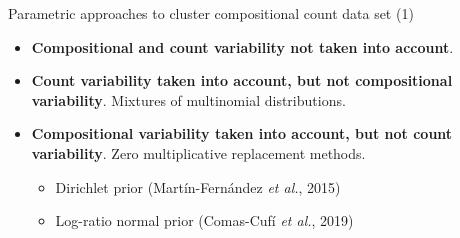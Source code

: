 \documentclass[9pt]{beamer}
\begin{document}
\begin{frame}{Parametric approaches to cluster compositional count data set (1)}

\begin{itemize}
\item \textbf{{\color{red}Compositional} and {\color{red}count} variability not taken into account}.\vspace{0.5cm}
\item \textbf{{\color{green}Count} variability taken into account, but not {\color{red}compositional} variability}. Mixtures of multinomial distributions.\vspace{0.5cm}
\item \textbf{{\color{green}Compositional} variability taken into account, but not {\color{red}count} variability}. Zero multiplicative replacement methods.
\begin{itemize}
\item Dirichlet prior  (Martín-Fernández \textit{et al.}, 2015)
\item Log-ratio normal  prior (Comas-Cufí \textit{et al.}, 2019)
\end{itemize}
\end{itemize}

\end{frame}
\end{document}
